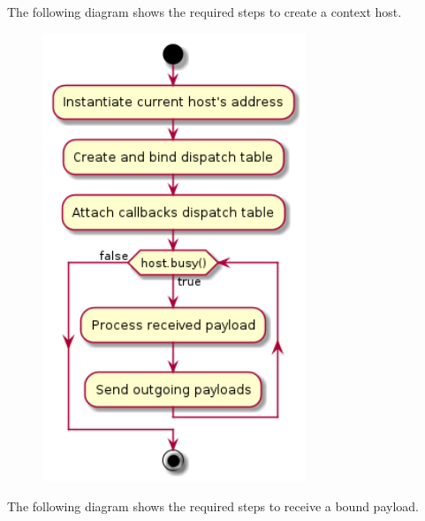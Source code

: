 \documentclass[12pt]{report}
\newcommand{\+}{\discretionary{\mbox{\scriptsize$\hookleftarrow$}}{}{}}
\begin{document}
                \newpage
                The following diagram shows the required steps to create a context host.

                \begin{figure}[H]
                \centering
                \includegraphics[width=0.7\textwidth]{d/ac/conthost.png}
                \end{figure}





                \newpage
                The following diagram shows the required steps to receive a bound payload.
\end{document}
